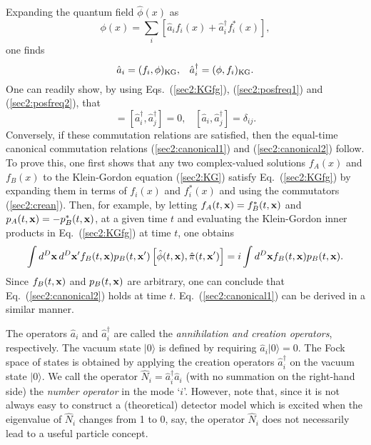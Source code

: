 \documentclass[12pt,nofootinbib,floatfix,aps,prd,showpacs,amsmath,amssymb,eqsecnum]{revtex4-2}
\begin{document}
Expanding the quantum field $\hat{\phi}(x)$ as
\begin{equation}
\phi(x) = \sum_{i}\left[ \hat{a}_i f_i(x) + 
\hat{a}_i^\dagger f_i^*(x)\right],
\end{equation}
one finds
\begin{equation}
\hat{a}_i =  (f_i,\phi)_{\rm KG}, \;\;\;
\hat{a}_i^\dagger =  (\phi,f_i)_{\rm KG}.
\end{equation}
One can readily show, by using Eqs.~(\ref{sec2:KGfg}),
(\ref{sec2:posfreq1}) and (\ref{sec2:posfreq2}), that
\begin{equation}
[ \hat{a}_i ,\hat{a}_j ]  
= 
[ \hat{a}_i^\dagger, \hat{a}_j^\dagger ] = 0,\;\;\;
[ \hat{a}_i , \hat{a}_j^\dagger ] 
=  
\delta_{i j}. 
\label{sec2:crean}
\end{equation}
Conversely, if these commutation relations 
are satisfied, then the equal-time
canonical commutation relations (\ref{sec2:canonical1}) and
(\ref{sec2:canonical2}) follow.  To prove this, one first shows that any 
two complex-valued solutions $f_A(x)$ and $f_B(x)$ to the Klein-Gordon
equation (\ref{sec2:KG}) satisfy Eq.~(\ref{sec2:KGfg}) by expanding them
in terms of $f_i(x)$ and $f_i^*(x)$ and using the commutators
(\ref{sec2:crean}).  Then, for example, by
letting $f_A(t,{\bf x}) = f_B^*(t,{\bf x})$ and
$p_A(t,{\bf x}) = -p_B^*(t,{\bf x})$, at a given time $t$ 
and evaluating the Klein-Gordon
inner products in Eq.~(\ref{sec2:KGfg}) at time $t$,
one obtains
\begin{equation}
\int d^D{\bf x}\, d^D{\bf x}'
f_B(t,{\bf x})p_B(t,{\bf x}')\left[\hat{\phi}(t,{\bf x}),\hat{\pi}(t,{\bf
x}')\right]
= i\int d^D{\bf x}f_B(t,{\bf x})p_B(t,{\bf x}).
\end{equation}
Since $f_B(t,{\bf x})$ and $p_B(t,{\bf x})$ are arbitrary, one can
conclude that Eq.~(\ref{sec2:canonical2}) holds at time $t$. 
Eq.~(\ref{sec2:canonical1}) can be derived in a similar manner.

The operators $\hat{a}_i$ 
and $\hat{a}^\dagger_i$ are called the {\em 
annihilation and creation 
operators}, respectively.  The vacuum state $|0\rangle$ 
is defined by requiring 
$\hat{a}_i|0\rangle=0$.  The Fock space of states is obtained by applying
the creation operators $\hat{a}_i^\dagger$ on the vacuum state 
$|0\rangle$.  We call the operator 
$\hat{N}_i = \hat{a}_i^\dagger \hat{a}_i$ 
(with no summation on the right-hand side) the {\em number operator}
in the mode `$i$'.  
However, note that, since it is not always 
easy to construct a (theoretical) detector model which is excited when 
the eigenvalue of $\hat{N}_i$ 
changes from 1 to 0, say, the operator $\hat{N}_i$ 
does not necessarily lead to a useful particle concept.
\end{document}

